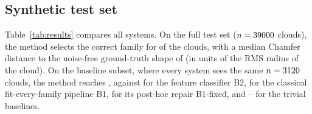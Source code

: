 
\subsection{Synthetic test set}
Table~\ref{tab:results} compares all systems. On the full test set ($n=39000$ clouds), the method selects the correct family for \accMethod{} \accCIMethod{} of the clouds, with a median Chamfer distance to the noise-free ground-truth shape of \cdMethod{} \cdCIMethod{} (in units of the RMS radius of the cloud). On the baseline subset, where every system sees the same $n=3120$ clouds, the method reaches \accMethodsub{}, against \accBtwo{} for the feature classifier B2, \accBone{} for the classical fit-every-family pipeline B1, \accBonefixed{} for its post-hoc repair B1-fixed, and \accBthreea{}--\accBthreec{} for the trivial baselines.

\begin{table}[tbp]
\centering
\caption{Synthetic test set. Fine accuracy is the exact family; coarse accuracy is the shape dimension (point set, curve, surface, blob). Chamfer is the median symmetric Chamfer distance (the sum of the two directed mean distances) between the selected, refined shape and the noise-free ground-truth shape; for surfaces it includes a sampling-grid floor (Sec.~\ref{sec:limitations}). Baselines and the ``baseline subset'' row use the same 20 clouds per family and cell. 95\% percentile cluster-bootstrap CIs over generator chunks; they are conservative (Sec.~\ref{sec:setup}). The full table (superset-tolerant accuracy, residual, axis error) is in \texttt{reports/exp01\_synthetic.md}.}
\label{tab:results}
\resizebox{\textwidth}{!}{}
\end{table}

